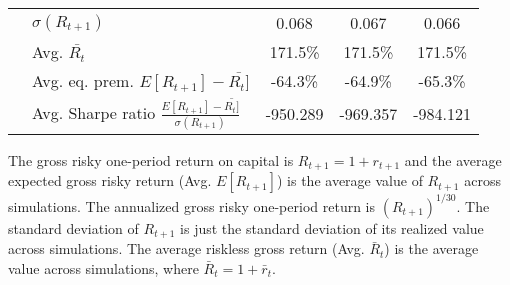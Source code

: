 \documentclass[letterpaper,12pt]{article}
\theoremstyle{definition}
\begin{document}
\begin{spacing}{1.5}
\begin{table}[htbp]
\begin{threeparttable}
\begin{tabular}{>{\small}l| >{\small}l| >{\small}c| >{\small}c| >{\small}c}
      & \quad $\sigma(R_{t+1})$ & 0.068 & 0.067 & 0.066 \\
      & \quad Avg. $\bar{R_t}$ & 171.5\% & 171.5\% & 171.5\% \\
      & \quad Avg. eq. prem. $E[R_{t+1}] - \bar{R_t]}$ & -64.3\% & -64.9\% & -65.3\% \\
      & \quad Avg. Sharpe ratio $\frac{E[R_{t+1}] - \bar{R_t]}}{\sigma(R_{t+1})}$ & -950.289 & -969.357 & -984.121 \\
      \hline\hline
    \end{tabular}
    \begin{tablenotes}
      \scriptsize{\item[]The gross risky one-period return on capital is $R_{t+1} = 1 + r_{t+1}$ and the average expected gross risky return (Avg. $E[R_{t+1}]$) is the average value of $R_{t+1}$ across simulations. The annualized gross risky one-period return is $(R_{t+1})^{1/30}$. The standard deviation of $R_{t+1}$ is just the standard deviation of its realized value across simulations. The average riskless gross return (Avg. $\bar{R}_t$) is the average value across simulations, where $\bar{R}_t=1+\bar{r}_t$.}
    \end{tablenotes}
    \end{threeparttable}
  \end{table}


\end{spacing}
\end{document}
